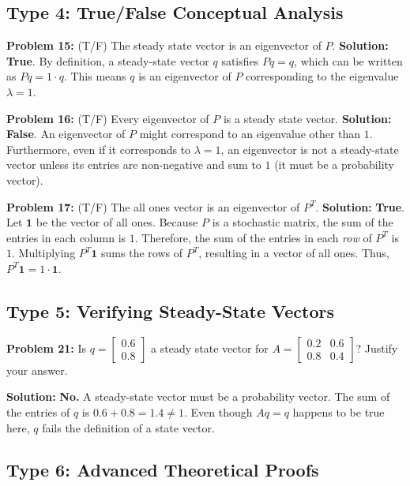 \documentclass[11pt, letterpaper]{article}
\theoremstyle{definition}
\theoremstyle{remark}
\begin{document}
\subsection{Type 4: True/False Conceptual Analysis}

\textbf{Problem 15:} (T/F) The steady state vector is an eigenvector of $P$.
\textbf{Solution:} \textbf{True}. By definition, a steady-state vector $q$ satisfies $Pq = q$, which can be written as $Pq = 1 \cdot q$. This means $q$ is an eigenvector of $P$ corresponding to the eigenvalue $\lambda = 1$.

\textbf{Problem 16:} (T/F) Every eigenvector of $P$ is a steady state vector.
\textbf{Solution:} \textbf{False}. An eigenvector of $P$ might correspond to an eigenvalue other than $1$. Furthermore, even if it corresponds to $\lambda = 1$, an eigenvector is not a steady-state vector unless its entries are non-negative and sum to $1$ (it must be a probability vector).

\textbf{Problem 17:} (T/F) The all ones vector is an eigenvector of $P^T$.
\textbf{Solution:} \textbf{True}. Let $\mathbf{1}$ be the vector of all ones. Because $P$ is a stochastic matrix, the sum of the entries in each column is $1$. Therefore, the sum of the entries in each \textit{row} of $P^T$ is $1$. Multiplying $P^T \mathbf{1}$ sums the rows of $P^T$, resulting in a vector of all ones. Thus, $P^T \mathbf{1} = 1 \cdot \mathbf{1}$.

\subsection{Type 5: Verifying Steady-State Vectors}

\textbf{Problem 21:} Is $q = \begin{bmatrix} 0.6 \\ 0.8 \end{bmatrix}$ a steady state vector for $A = \begin{bmatrix} 0.2 & 0.6 \\ 0.8 & 0.4 \end{bmatrix}$? Justify your answer.

\textbf{Solution:}
\textbf{No.} A steady-state vector must be a probability vector. The sum of the entries of $q$ is $0.6 + 0.8 = 1.4 \neq 1$. Even though $Aq = q$ happens to be true here, $q$ fails the definition of a state vector.

\subsection{Type 6: Advanced Theoretical Proofs}
\end{document}
